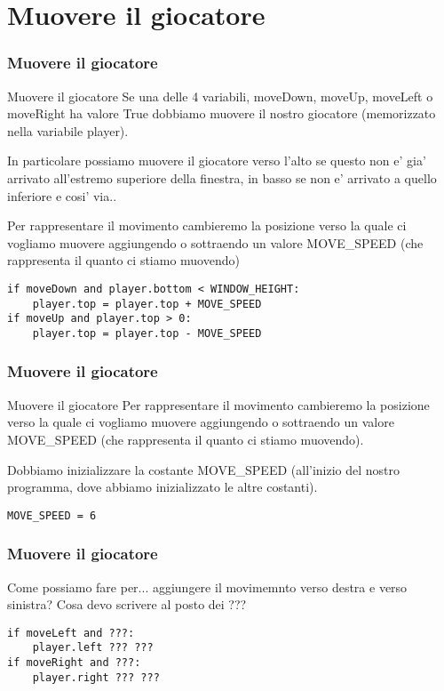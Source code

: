 \documentclass{beamer}
\begin{document}
\section{Muovere il giocatore}

\begin{frame}[fragile]
\frametitle{Muovere il giocatore}

\begin{block}{Muovere il giocatore}
Se una delle 4 variabili, moveDown, moveUp, moveLeft o moveRight ha valore True dobbiamo muovere il nostro giocatore (memorizzato nella variabile player).

In particolare possiamo muovere il giocatore verso l'alto se questo non e' gia' arrivato all'estremo superiore della finestra, in basso se non e' arrivato a quello inferiore e cosi' via..

Per rappresentare il movimento cambieremo la posizione verso la quale ci vogliamo muovere aggiungendo o sottraendo un valore MOVE_SPEED (che rappresenta il quanto ci stiamo muovendo)
\end{block}

\begin{lstlisting}
if moveDown and player.bottom < WINDOW_HEIGHT:
    player.top = player.top + MOVE_SPEED
if moveUp and player.top > 0:
    player.top = player.top - MOVE_SPEED
\end{lstlisting}
\end{frame}

\begin{frame}[fragile]
\frametitle{Muovere il giocatore}

\begin{block}{Muovere il giocatore}
Per rappresentare il movimento cambieremo la posizione verso la quale ci vogliamo muovere aggiungendo o sottraendo un valore MOVE_SPEED (che rappresenta il quanto ci stiamo muovendo).

Dobbiamo inizializzare la costante MOVE_SPEED (all'inizio del nostro programma, dove abbiamo inizializzato le altre costanti).
\end{block}

\begin{lstlisting}
MOVE_SPEED = 6
\end{lstlisting}
\end{frame}


\begin{frame}[fragile]
    \frametitle{Muovere il giocatore}

    \begin{block}{Come possiamo fare per...}
aggiungere il movimemnto verso destra e verso sinistra?
Cosa devo scrivere al posto dei ???
    \end{block}
    \begin{lstlisting}
if moveLeft and ???:
    player.left ??? ???
if moveRight and ???:
    player.right ??? ???
    \end{lstlisting}
\end{frame}
\end{document}
